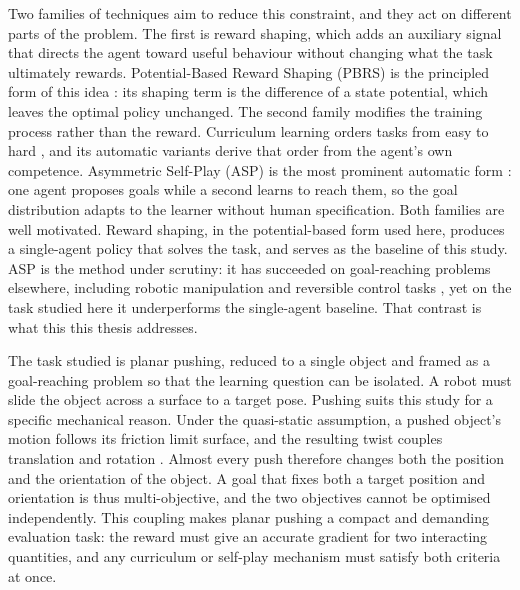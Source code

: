 Two families of techniques aim to reduce this constraint, and they act on
different parts of the problem. The first is reward shaping, which adds an
auxiliary signal that directs the agent toward useful behaviour without changing
what the task ultimately rewards. Potential-Based Reward Shaping (PBRS) is the
principled form of this idea \cite{Ng1999PolicyInvariance}: its shaping term is
the difference of a state potential, which leaves the optimal policy unchanged.
The second family modifies the training process rather than the reward. Curriculum
learning orders tasks from easy to hard \cite{Narvekar2020}, and its automatic
variants derive that order from the agent's own competence. Asymmetric Self-Play
(ASP) is the most prominent automatic form
\cite{Sukhbaatar2018IntrinsicMotivation, OpenAI2021AsymmetricSF}: one agent
proposes goals while a second learns to reach them, so the goal distribution
adapts to the learner without human specification. Both families are well
motivated. Reward shaping, in the potential-based form used here, produces a
single-agent policy that solves the task, and serves as the baseline of this study.
ASP is the method under scrutiny: it has succeeded on goal-reaching problems
elsewhere, including robotic manipulation \cite{OpenAI2021AsymmetricSF} and
reversible control tasks \cite{Sukhbaatar2018IntrinsicMotivation}, yet on the task
studied here it underperforms the single-agent baseline. That contrast is what this
this thesis addresses. 

The task studied is planar pushing,
reduced to a single object and framed as a goal-reaching problem so that the
learning question can be isolated. A robot must slide the object across a surface
to a target pose. Pushing suits this study
for a specific mechanical reason. Under the quasi-static assumption, a pushed
object's motion follows its friction limit surface, and the resulting twist
couples translation and rotation \cite{Mason1986Pushing, Goyal1991}. Almost every
push therefore changes both the position and the orientation of the object. A goal
that fixes both a target position and orientation is thus multi-objective, and the
two objectives cannot be optimised independently. This coupling makes planar
pushing a compact and demanding evaluation task: the reward must give an accurate
gradient for two interacting quantities, and any curriculum or self-play mechanism
must satisfy both criteria at once.

